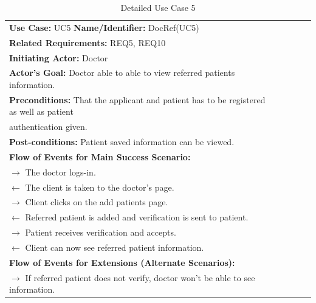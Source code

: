\documentclass[a4paper]{article}
\begin{document}
\FloatBarrier

\begin{table}[h!]
\centering
\caption*{Detailed Use Case 5}
\label{DetailedUC2}
\begin{tabular}{|c|llll}
\cline{1-1}

\multicolumn{1}{|l|}{\textbf{Use Case:} UC5 \textbf{Name/Identifier:} DocRef(UC5)} &  &  &  &  \\ \cline{1-1}

\multicolumn{1}{|l|}{\textbf{Related Requirements:} REQ5, REQ10} &  &  &  &  \\

\multicolumn{1}{|l|}{\textbf{Initiating Actor:} Doctor} &  &  &  &  \\

\multicolumn{1}{|l|}{\textbf{Actor’s Goal:} Doctor able to able to view referred patients information.} &  &  &  &  \\

\multicolumn{1}{|l|}{\textbf{Preconditions:} That the applicant and patient has to be registered as well as patient} &  &  &  &  \\

\multicolumn{1}{|l|}{authentication given.} &  &  &  &  \\

\multicolumn{1}{|l|}{\textbf{Post-conditions:} Patient saved information can be viewed.} &  &  &  &  \\

\multicolumn{1}{|l|}{\textbf{Flow of Events for Main Success Scenario:}} &  &  &  &  \\

\multicolumn{1}{|l|}{ $ \rightarrow $ The doctor logs-in.} &  &  &  &  \\

\multicolumn{1}{|l|}{ $ \leftarrow $ The client is taken to the doctor's page.} &  &  &  &  \\

\multicolumn{1}{|l|}{ $ \rightarrow $ Client clicks on the add patients page.} &  &  &  &  \\

\multicolumn{1}{|l|}{ $ \leftarrow $ Referred patient is added and verification is sent to patient.} &  &  &  &  \\

\multicolumn{1}{|l|}{ $ \rightarrow $ Patient receives verification and accepts.} &  &  &  &  \\

\multicolumn{1}{|l|}{ $ \leftarrow $ Client can now see referred patient information.} &  &  &  &  \\

\multicolumn{1}{|l|}{\textbf{Flow of Events for Extensions (Alternate Scenarios):}} &  &  &  &  \\

\multicolumn{1}{|l|}{ $ \rightarrow $ If referred patient does not verify, doctor won't be able to see information.} &  &  &  &  \\ \cline{1-1}

\end{tabular}
\end{table}
\end{document}
